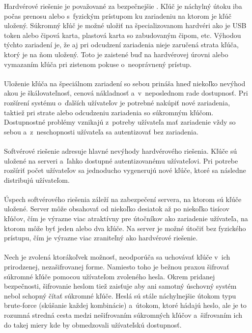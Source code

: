 \documentclass[
  digital, %
  table,   %
oneside,
  nolof,     %
  nolot,     %
]{fithesis3}
\begin{document}
Hardvérové riešenie je považované za bezpečnejšie \cite{privateKeyStorage}. Kľúč je náchylný útoku iba počas prenosu alebo s~fyzickým prístupom ku zariadeniu na ktorom je kľúč uložený. Súkromný kľúč je možné uložiť na špecializovanom hardvéri ako je USB token alebo  čipová karta, plastová karta so zabudovaným čipom, etc. Výhodou týchto zariadení je, že aj pri odcudzení zariadenia nieje zaručená strata kľúča, ktorý je na ňom uložený. Toto je zaistené buď na hardvérovej úrovni alebo vymazaním kľúča pri zistenom pokuse o~neoprávnený prístup.\paragraph{}
Uloženie kľúča na špeciálnom zariadení so sebou prináša hneď niekoľko nevýhod akou je škálovateľnosť, cenová nákladnosť a~v~neposlednom rade dostupnosť. Pri rozšírení systému o~ďalších užívateľov je potrebné nakúpiť nové zariadenia, taktiež pri strate alebo odcudzeniu zariadenia so súkromným kľúčom. Dostupnostné problémy vznikajú z~potreby užívateľa mať zariadenie vždy so sebou a~z~neschopnosti užívateľa sa autentizovať bez zariadenia. \paragraph{} 
Softvérové riešenie adresuje hlavné nevýhody hardvérového riešenia. Kľúče sú uložené na serveri a~ľahko dostupné autentizovanému užívateľovi. Pri potrebe rozšíriť počet užívateľov sa jednoducho vygenerujú nové kľúče, ktoré sa následne distribujú užívateľom.  \paragraph{}
Úspech softvérového riešenia záleží na zabezpečení servera, na ktorom sú kľúče uložené. Server môže obsahovať od niekoľko desiatok až po niekoľko tisícov kľúčov, čím je výrazne viac atraktívny pre útočníkov ako zariadenie užívateľa, na ktorom môže byť jeden alebo dva kľúče. Na server je možné útočiť bez fyzického prístupu, čím je výrazne viac zraniteľný ako hardvérové riešenie. \paragraph{}

Nech je zvolená ktorákoľvek možnosť, neodporúča sa  uchovávať kľúče v~ich prirodzenej, nezašifrovanej forme. Namiesto toho je bežnou praxou šifrovať súkromné kľúče pomocou užívateľom zvoleného hesla. Okrem pridanej bezpečnosti, šifrovanie heslom tiež zaisťuje aby ani samotný úschovný systém nebol schopný čítať súkromné kľúče. Heslá sú stále náchylnejšie útokom typu brute-force (skúšanie každej kombinácie) a~útokom, ktoré hádajú heslo, ale je to rozumná stredná cesta medzi nešifrovaním súkromných kľúčov a~šifrovaním ich do takej miery kde by obmedzovali užívateľskú dostupnosť. \paragraph{}   
 
\end{document}
